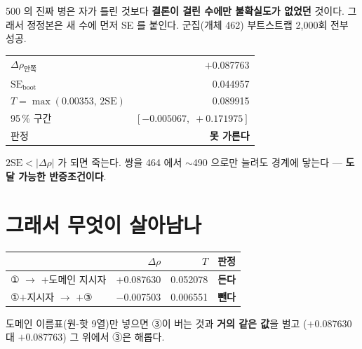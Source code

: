 \documentclass[10pt]{article}
\begin{document}
500 의 진짜 병은 자가 틀린 것보다 \textbf{결론이 걸린 수에만 불확실도가 없었던} 것이다.
그래서 정정본은 새 수에 먼저 SE 를 붙인다. 군집(개체 462) 부트스트랩 2{,}000회 전부 성공.

\begin{center}\small
\begin{tabular}{lr}
\toprule
$\Delta\rho_\text{안쪽}$ & $+$0.087763 \\
$\mathrm{SE}_\text{boot}$ & 0.044957 \\
$T=\max(0.00353,\,2\mathrm{SE})$ & 0.089915 \\
95\,\% 구간 & $[-0.005067,\;+0.171975]$ \\
\midrule
판정 & \textbf{못 가른다} \\
\bottomrule
\end{tabular}
\end{center}

{$2\mathrm{SE}<|\Delta\rho|$ 가 되면 죽는다. 쌍을 464 에서 $\sim$490 으로만 늘려도
경계에 닿는다 --- \textbf{도달 가능한 반증조건이다}.}

\section{그래서 무엇이 살아남나}

\begin{center}\small
\begin{tabular}{lrrl}
\toprule
 & $\Delta\rho$ & $T$ & 판정 \\
\midrule
① $\to$ $+$도메인 지시자 & $+$0.087630 & 0.052078 & \textbf{든다} \\
①$+$지시자 $\to$ $+$③   & $-$0.007503 & 0.006551 & \textbf{뺀다} \\
\bottomrule
\end{tabular}
\end{center}

도메인 이름표(원-핫 9열)만 넣으면 ③이 버는 것과 \textbf{거의 같은 값}을 벌고
($+$0.087630 대 $+$0.087763) 그 위에서 ③은 해롭다.

\end{document}

